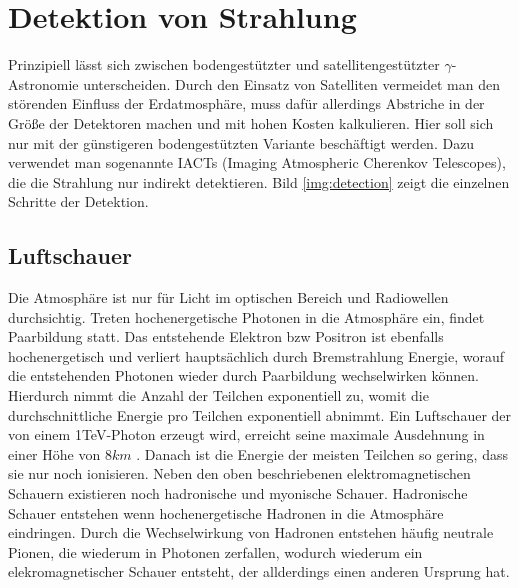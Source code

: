 \section{Detektion von Strahlung}
Prinzipiell lässt sich zwischen bodengestützter und satellitengestützter $\gamma$-Astronomie unterscheiden. Durch den Einsatz von Satelliten vermeidet man den störenden Einfluss der Erdatmosphäre, muss dafür allerdings Abstriche in der Größe der Detektoren machen und mit hohen Kosten kalkulieren. Hier soll sich nur mit der günstigeren bodengestützten Variante beschäftigt werden. Dazu verwendet man sogenannte IACTs (Imaging Atmospheric Cherenkov Telescopes), die die Strahlung nur indirekt detektieren. Bild \ref{img:detection} zeigt die einzelnen Schritte der Detektion.

\subsection{Luftschauer}
Die Atmosphäre ist nur für Licht im optischen Bereich und Radiowellen durchsichtig. Treten hochenergetische Photonen in die Atmosphäre ein, findet Paarbildung statt. Das entstehende Elektron bzw Positron ist ebenfalls hochenergetisch und verliert hauptsächlich durch Bremstrahlung Energie, worauf die entstehenden Photonen wieder durch Paarbildung wechselwirken können. Hierdurch nimmt die Anzahl der Teilchen exponentiell zu, womit die durchschnittliche Energie pro Teilchen exponentiell abnimmt.
Ein Luftschauer der von einem 1TeV-Photon erzeugt wird, erreicht seine maximale Ausdehnung in einer Höhe von $8\unit{km}$ \cite{GB-VHE}. Danach ist die Energie der meisten Teilchen so gering, dass sie nur noch ionisieren.
Neben den oben beschriebenen elektromagnetischen Schauern existieren noch hadronische und myonische Schauer. Hadronische Schauer entstehen wenn hochenergetische Hadronen in die Atmosphäre eindringen. Durch die Wechselwirkung von Hadronen entstehen häufig neutrale Pionen, die wiederum in Photonen zerfallen, wodurch wiederum ein elekromagnetischer Schauer entsteht, der allderdings einen anderen Ursprung hat. %

